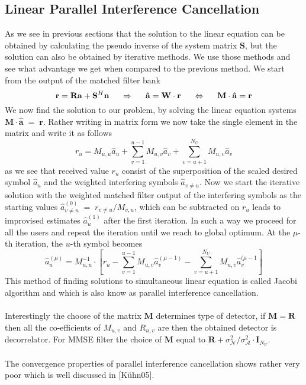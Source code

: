 \subsection{Linear Parallel Interference Cancellation}
As we see in previous sections that the solution to the linear equation can be obtained by calculating the pseudo inverse of the system matrix $\mathrm{\mathbf{S}}$, but the solution can also be obtained by iterative methods. We use those methods and see what advantage we get when compared to the previous method. We start from the output of the matched filter bank
\begin{equation}
\mathrm{\mathbf{r}}=\mathrm{\mathbf{R}}\mathrm{\mathbf{a}}+\mathrm{\mathbf{S}}^H\mathrm{\mathbf{n}}\hspace{5mm}\Rightarrow\hspace{5mm}\mathrm{\mathbf{\hat{a}}}=\mathrm{\mathbf{W}}\cdot\mathrm{\mathbf{r}}\hspace{5mm}\Leftrightarrow\hspace{5mm}\mathrm{\mathbf{M}}\cdot\mathrm{\mathbf{\hat{a}}}=\mathrm{\mathbf{r}}
\end{equation}
We now find the solution to our problem, by solving the linear equation systems $\mathrm{\mathbf{M}}\cdot\mathrm{\mathbf{\hat{a}}}\;=\;\mathrm{\mathbf{r}}$. Rather writing in matrix form we now take the single element in the matrix and write it as follows
\begin{equation}
r_u=M_{u,u}\hat{a}_u+\sum\limits_{v=1}^{u-1}M_{u,v}\hat{a}_v+\sum\limits_{v=u+1}^{N_U}M_{u,v}\hat{a}_v
\end{equation}
as we see that received value $r_u$ consist of the superposition of the scaled desired symbol $\hat{a}_u$ and the weighted interfering symbols $\hat{a}_{v\ne u}$. Now we start the iterative solution with the weighted matched filter output of the interfering symbols as the starting values $\hat{a}^{(0)}_{v\ne u}\;=\;r_{v\ne u}/M_{v,u}$, which can be subtracted on $r_u$ leads to improvised estimates $\hat{a}_u^{(1)}$ after the first iteration. In such a way we proceed for all the users and repeat the iteration until we reach to global optimum. At the $\mu$-th iteration, the $u$-th symbol becomes
\begin{equation}
\hat{a}_u^{(\mu)}=M_{u,u}^{-1}\cdot\left[r_u-\sum\limits_{v=1}^{u-1}M_{u,v}\hat{a}_v^{(\mu-1)}-\sum\limits_{v=u+1}^{N_U}M_{u,v}\hat{a}_v^{(\mu-1}\right]
\end{equation}
This method of finding solutions to simultaneous linear equation is called Jacobi algorithm and which is also know as parallel interference cancellation.\\ \\
Interestingly the choose of the matrix $\mathrm{\mathbf{M}}$ determines type of detector, if $\mathrm{\mathbf{M}}=\mathrm{\mathbf{R}}$ then all the co-efficients of $M_{u,v}$ and $R_{u,v}$ are then the obtained detector is decorrelator. For MMSE filter the choice of $\mathrm{\mathbf{M}}$ equal to $\mathrm{\mathbf{R}}+\sigma_{\mathcal{N}}^{2}/\sigma_{\mathcal{A}}^{2}\cdot\mathrm{\mathbf{I}}_{N_U}$. \\ \\
The convergence properties of parallel interference cancellation shows rather very poor which is well discussed in [K\"uhn05].
